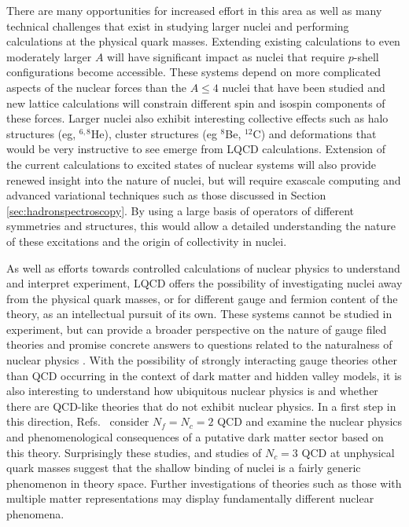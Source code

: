 There are many opportunities for increased effort in this area as well as many technical challenges that exist in studying larger nuclei and performing calculations at the physical quark masses. 
Extending existing calculations to even moderately larger $A$ will have significant impact as nuclei that require $p$-shell configurations become accessible. These systems depend on more complicated aspects of the nuclear forces than the $A\le4$ nuclei that have been studied and new lattice calculations will constrain different spin and isospin components of these forces. Larger nuclei also exhibit interesting collective effects such as halo structures (eg,  ${}^{6,8}$He), cluster structures (eg ${}^{8}$Be, ${}^{12}$C) and deformations that would be very instructive to see emerge from LQCD calculations.  Extension of the current calculations to excited states of nuclear systems will also provide renewed insight into the nature of nuclei, but will require exascale computing and advanced variational techniques such as those discussed in Section \ref{sec:hadronspectroscopy}.
By using a large basis of operators of different symmetries and structures, this would allow a detailed understanding the nature of these excitations and the origin of collectivity in nuclei. 

As well as efforts towards controlled calculations of nuclear physics to understand and interpret experiment, LQCD offers the possibility of investigating nuclei away from the physical quark masses, or for different gauge and fermion content of the theory, as an intellectual pursuit of its own. These systems cannot be studied in experiment, but can provide a broader perspective on the nature of gauge filed theories and promise concrete answers to questions related to the naturalness of nuclear physics \cite{Orginos:2015aya,Epelbaum:2012iu,Berengut:2013nh,CarrilloSerrano:2012ja}. With the  possibility of strongly interacting gauge theories other than QCD occurring in the context of dark matter and hidden valley models, it is also interesting to understand how ubiquitous nuclear physics is and whether there are QCD-like theories that do not exhibit nuclear physics.  In a first step in this direction,  Refs.~\cite{Detmold:2014qqa,Detmold:2014kba}  consider $N_f=N_c=2$ QCD and examine the nuclear physics and phenomenological consequences of  a putative dark matter sector based on this theory. Surprisingly these studies, and studies of $N_c=3$ QCD at unphysical quark masses suggest that the shallow binding of nuclei is a fairly generic phenomenon in theory space. Further investigations of theories such as those with multiple matter representations \cite{Ayyar:2017qdf} may display fundamentally different nuclear phenomena.



